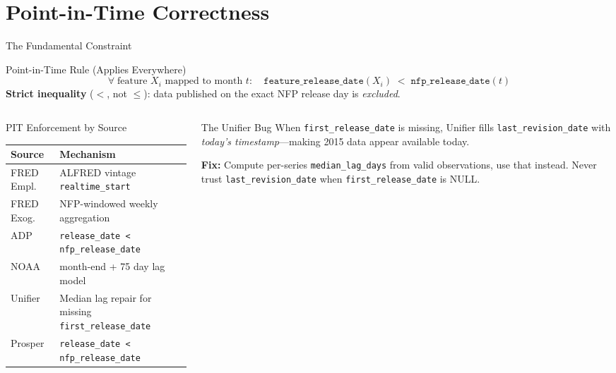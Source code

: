 \documentclass[aspectratio=169,10pt]{beamer}
\begin{document}
\section{Point-in-Time Correctness}

\begin{frame}{The Fundamental Constraint}
\begin{block}{Point-in-Time Rule (Applies Everywhere)}
\[
\forall\; \text{feature } X_i \text{ mapped to month } t: \quad
\texttt{feature\_release\_date}(X_i) \;<\; \texttt{nfp\_release\_date}(t)
\]
\textbf{Strict inequality} ($<$, not $\le$): data published on the exact NFP release day is \emph{excluded}.
\end{block}

\vspace{0.3cm}
\begin{columns}[T]
\begin{column}{0.55\textwidth}
\begin{exampleblock}{PIT Enforcement by Source}
\footnotesize
\begin{tabular}{@{}lp{5.5cm}@{}}
\toprule
\textbf{Source} & \textbf{Mechanism} \\
\midrule
FRED Empl. & ALFRED vintage \texttt{realtime\_start} \\
FRED Exog. & NFP-windowed weekly aggregation \\
ADP & \texttt{release\_date < nfp\_release\_date} \\
NOAA & month-end + 75 day lag model \\
Unifier & Median lag repair for missing \texttt{first\_release\_date} \\
Prosper & \texttt{release\_date < nfp\_release\_date} \\
\bottomrule
\end{tabular}
\end{exampleblock}
\end{column}
\begin{column}{0.42\textwidth}
\begin{alertblock}{The Unifier Bug}
\footnotesize
When \texttt{first\_release\_date} is missing, Unifier fills \texttt{last\_revision\_date} with \emph{today's timestamp}---making 2015 data appear available today.

\textbf{Fix:} Compute per-series \texttt{median\_lag\_days} from valid observations, use that instead. Never trust \texttt{last\_revision\_date} when \texttt{first\_release\_date} is NULL.
\end{alertblock}
\end{column}
\end{columns}
\end{frame}
\end{document}
